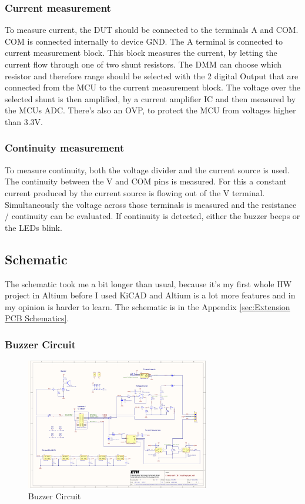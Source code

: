 \subsubsection{Current measurement}
To measure current, the DUT should be connected to the terminals A and COM. COM is connected internally to device GND. The A terminal is connected to current measurement block. This block measures the current, by letting the current flow through one of two shunt resistors. The DMM can choose which resistor and therefore range should be selected with the 2 digital Output that are connected from the MCU to the current measurement block. The voltage over the selected shunt is then amplified, by a current amplifier IC and then measured by the MCUs ADC. There's also an OVP, to protect the MCU from voltages higher than 3.3V. \cite{DMM_Video_ElectroNoobs}

\subsubsection{Continuity measurement}
To measure continuity, both the voltage divider and the current source is used. The continuity between the V and COM pins is measured. For this a constant current produced by the current source is flowing out of the V terminal. Simultaneously the voltage across those terminals is measured and the resistance / continuity can be evaluated. If continuity is detected, either the buzzer beeps or the LEDs blink. \cite{DMM_Video_ElectroNoobs}



\subsection{Schematic}
The schematic took me a bit longer than usual, because it's my first whole HW project in Altium before I used KiCAD and Altium is a lot more features and in my opinion is harder to learn. The schematic is in the Appendix \ref{sec:Extension PCB Schematics}.

\subsubsection{Buzzer Circuit}

\begin{figure}[H]
	\centering
	\includegraphics[width=8cm, trim={3.4cm 19cm 28.5cm 2cm}, clip]{../../../5_Hardware/PCB_EXTENSION_CircuitVoyager_pre1/Project Outputs for PCB_EXT_CV_PRE1/Schematic_PCB_EXTENSION_CircuitVoyager_pre1.pdf}
	\caption{Buzzer Circuit}
	\label{fig:Buzzer Circuit}
\end{figure}

